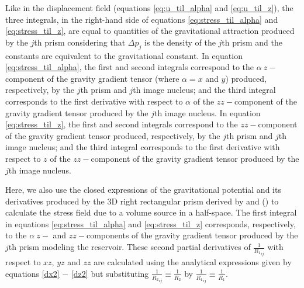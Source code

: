 \documentclass[journal abbreviation, manuscript]{copernicus}
\begin{document}
Like in the displacement field (equations \ref{eq:u_til_alpha} and \ref{eq:u_til_z}), the three integrals, in the right-hand side of equations \ref{eq:stress_til_alpha} and \ref{eq:stress_til_z}, are equal to  quantities of the gravitational attraction produced by the $j$th prism considering that $\Delta p_{j}$ is the density of the $j$th prism and the constants are equivalent to the gravitational constant. 
In equation \ref{eq:stress_til_alpha}, the first and second integrals correspond to the $\alpha \:z-$component of the gravity gradient tensor (where  $\alpha = x$ and $y$) produced, respectively, by the $j$th prism and $j$th image nucleus; and the third integral corresponds to the first derivative with respect to $\alpha$ of the $zz-$component of the gravity gradient tensor produced by the $j$th image nucleus. 
In equation \ref{eq:stress_til_z}, the first and second integrals correspond to the $zz-$component of the gravity gradient tensor produced, respectively, by the $j$th prism and $j$th image nucleus; and the third integral corresponds to the first derivative with respect to $z$ of the $zz-$component of the gravity gradient tensor produced by the $j$th image nucleus. 

Here, we also use the closed expressions of the gravitational potential and its derivatives produced by the 3D right rectangular prism derived by \cite{Nagyetal2000} and (\citeyear{Nagyetal2002}) to calculate the stress field due to a volume source in a half-space.  
The first integral in equations  \ref{eq:stress_til_alpha} and \ref{eq:stress_til_z}
corresponds, respectively, to the $\alpha \:z-$ and $zz-$components of the gravity gradient tensor produced by the $j$th prism modeling the reservoir.
These second partial derivatives of ${\frac{1}{{R_1}_{ij}}}$ with respect to $xz$, $yz$ and $zz$ are calculated using the analytical expressions given by equations \ref{dx2} $-$ \ref{dz2} but substituting 
$\frac{1}{{R_2}_{ij}} \equiv \frac{1}{R_2}$ by 
$\frac{1}{{R_1}_{ij}} \equiv \frac{1}{R_1}$.
\end{document}
